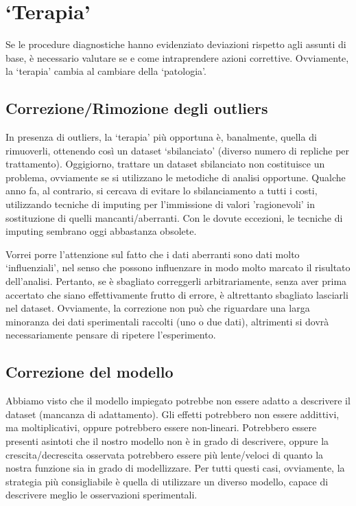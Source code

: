 \documentclass[a4paper,12pt,oneside]{book}
\begin{document}
\hypertarget{terapia}{%
\section{`Terapia'}\label{terapia}}

Se le procedure diagnostiche hanno evidenziato deviazioni rispetto agli assunti di base, è necessario valutare se e come intraprendere azioni correttive. Ovviamente, la `terapia' cambia al cambiare della `patologia'.

\hypertarget{correzionerimozione-degli-outliers}{%
\subsection{Correzione/Rimozione degli outliers}\label{correzionerimozione-degli-outliers}}

In presenza di outliers, la `terapia' più opportuna è, banalmente, quella di rimuoverli, ottenendo così un dataset `sbilanciato' (diverso numero di repliche per trattamento). Oggigiorno, trattare un dataset sbilanciato non costituisce un problema, ovviamente se si utilizzano le metodiche di analisi opportune. Qualche anno fa, al contrario, si cercava di evitare lo sbilanciamento a tutti i costi, utilizzando tecniche di imputing per l'immissione di valori 'ragionevoli' in sostituzione di quelli mancanti/aberranti. Con le dovute eccezioni, le tecniche di imputing sembrano oggi abbastanza obsolete.

Vorrei porre l'attenzione sul fatto che i dati aberranti sono dati molto `influenziali', nel senso che possono influenzare in modo molto marcato il risultato dell'analisi. Pertanto, se è sbagliato correggerli arbitrariamente, senza aver prima accertato che siano effettivamente frutto di errore, è altrettanto sbagliato lasciarli nel dataset. Ovviamente, la correzione non può che riguardare una larga minoranza dei dati sperimentali raccolti (uno o due dati), altrimenti si dovrà necessariamente pensare di ripetere l'esperimento.

\hypertarget{correzione-del-modello}{%
\subsection{Correzione del modello}\label{correzione-del-modello}}

Abbiamo visto che il modello impiegato potrebbe non essere adatto a descrivere il dataset (mancanza di adattamento). Gli effetti potrebbero non essere addittivi, ma moltiplicativi, oppure potrebbero essere non-lineari. Potrebbero essere presenti asintoti che il nostro modello non è in grado di descrivere, oppure la crescita/decrescita osservata potrebbero essere più lente/veloci di quanto la nostra funzione sia in grado di modellizzare. Per tutti questi casi, ovviamente, la strategia più consigliabile è quella di utilizzare un diverso modello, capace di descrivere meglio le osservazioni sperimentali.
\end{document}
